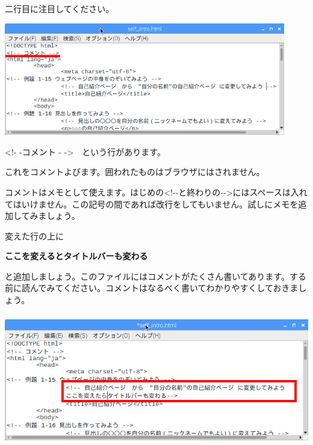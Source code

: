 \documentclass[a4paper,12pt]{jarticle}
\begin{document}
二行目に注目してください。

\centering
\includegraphics[width=12.273cm,height=4.909cm]{textbook-img151.png}
\flushleft



\bigskip

{\textless}!- -コメント -
-{\textgreater}　という行があります。

これをコメントよびます。囲われたものはブラウザにはされません。

コメントはメモとして使えます。はじめの{\textless}!-{}-と終わりの{}-{}-{\textgreater}にはスペースは入れてはいけません。この記号の間であれば改行をしてもいません。試しにメモを追加してみましょう。

変えた行の上に

\textbf{ここを変えるとタイトルバーも変わる
}

と追加しましょう。このファイルにはコメントがたくさん書いてあります。する前に読んでみてください。コメントはなるべく書いてわかりやすくしておきましょう。


\centering
\includegraphics[width=14.42cm,height=5.768cm]{textbook-img150.png}
\end{document}
